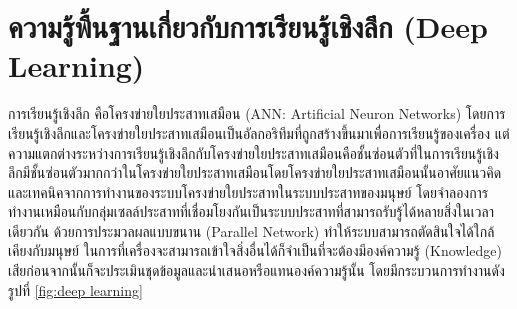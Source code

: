 			
\section{ความรู้พื้นฐานเกี่ยวกับการเรียนรู้เชิงลึก (Deep Learning)}
การเรียนรู้เชิงลึก \cite{deeplearning} คือโครงข่ายใยประสาทเสมือน (ANN: Artificial Neuron Networks) โดยการเรียนรู้เชิงลึกและโครงข่ายใยประสาทเสมือนเป็นอัลกอริทึมที่ถูกสร้างขึ้นมาเพื่อการเรียนรู้ของเครื่อง แต่ความแตกต่างระหว่างการเรียนรู้เชิงลึกกับโครงข่ายใยประสาทเสมือนคือชั้นซ่อนตัวที่ในการเรียนรู้เชิงลึกมีชั้นซ่อนตัวมากกว่าในโครงข่ายใยประสาทเสมือนโดยโครงข่ายใยประสาทเสมือนนั้นอาศัยแนวคิดและเทคนิคจากการทำงานของระบบโครงข่ายใยประสาทในระบบประสาทของมนุษย์ โดยจำลองการทำงานเหมือนกับกลุ่มเซลล์ประสาทที่เชื่อมโยงกันเป็นระบบประสาทที่สามารถรับรู้ได้หลายสิ่งในเวลาเดียวกัน ด้วยการประมวลผลแบบขนาน (Parallel Network) ทำให้ระบบสามารถตัดสินใจได้ใกล้เคียงกับมนุษย์ ในการที่เครื่องจะสามารถเข้าใจสิ่งอื่นได้ก็จำเป็นที่จะต้องมีองค์ความรู้ (Knowledge) เสียก่อนจากนั้นก็จะประเมินชุดข้อมูลและนำเสนอหรือแทนองค์ความรู้นั้น โดยมีกระบวนการทำงานดังรูปที่ \ref{fig:deep learning}

